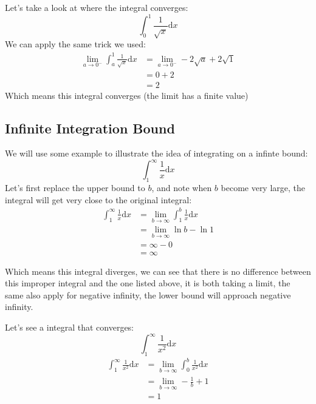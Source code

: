 \documentclass{article}
\begin{document}
Let's take a look at where the integral converges:
\[
    \int_0^1\frac{1}{\sqrt{x}}\mathrm{d}x
\]
We can apply the same trick we used:
\[
    \begin{split}
        \lim_{a\to 0^-} \int_{a}^{1}\frac{1}{\sqrt{x}}\mathrm{d}x &= \lim_{a\to 0^-} -2\sqrt{a} + 2\sqrt{1} \\
        & = 0 + 2 \\
        & = 2
    \end{split}
\]
Which means this integral converges (the limit has a finite value)

\subsection{Infinite Integration Bound}
We will use some example to illustrate the idea of integrating on a infinte bound:
\[
    \int_{1}^{\infty} \frac{1}{x}\mathrm{d}x
\]
Let's first replace the upper bound to $b$, and note when $b$ become very large, the integral will get very close to the original integral:
\[
    \begin{split}
        \int_{1}^{\infty} \frac{1}{x}\mathrm{d}x & = \lim_{b\to \infty} \int_{1}^{b} \frac{1}{x}\mathrm{d}x\\
        & = \lim_{b\to \infty} \ln b - \ln 1 \\
        & = \infty - 0\\
        & = \infty
    \end{split}
\]

Which means this integral diverges, we can see that there is no difference between this improper integral and the one listed above, it is both taking a limit, the same also apply for negative infinity,
the lower bound will approach negative infinity.

Let's see a integral that converges:
\[
    \int_{1}^{\infty} \frac{1}{x^2}\mathrm{d}x
\]
\[
    \begin{split}
        \int_{1}^{\infty} \frac{1}{x^2}\mathrm{d}x & = \lim_{b\to \infty} \int_{0}^{b}\frac{1}{x^2}\mathrm{d}x\\
        & = \lim_{b\to \infty} -\frac{1}{b} + 1 \\
        & = 1
    \end{split}
\]
\end{document}
